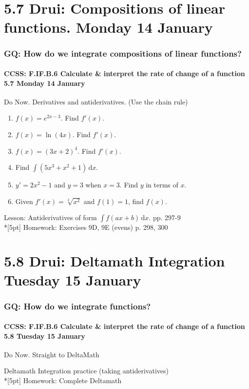 \documentclass{beamer}
\begin{document}
\section{5.7 Drui: Compositions of linear functions. Monday 14 January}
\frame
{
  \frametitle{GQ: How do we integrate compositions of linear functions?}
  \framesubtitle{CCSS: F.IF.B.6 Calculate \& interpret the rate of change of a function  \alert{5.7 Monday 14 January}}

  \begin{block}{Do Now. Derivatives and antiderivatives. (Use the chain rule)}
  \begin{enumerate}
    \item $f(x)=e^{2x-3}$. Find $f'(x)$.
    \item $f(x)= \ln (4x)$. Find $f'(x)$.
    \item $f(x)= (3x+2)^4$. Find $f'(x)$.

    \item Find $\int (5x^3+x^2+1) \,\mathrm{d}x$.
    \item $y'=2x^2-1$ and $y=3$ when $x=3$. Find $y$ in terms of $x$.
    \item Given $f'(x)=\sqrt[3]{x^2}$ and $f(1)=1$, find $f(x)$.
  \end{enumerate}
  \end{block}
  Lesson: Antiderivatives of form $\int f(ax+b) \,\mathrm{d}x$. pp. 297-9\\*[5pt]
  Homework: Exercises 9D, 9E (evens) p. 298, 300
}

\section{5.8 Drui: Deltamath Integration Tuesday 15 January}
\frame
{
  \frametitle{GQ: How do we integrate functions?}
  \framesubtitle{CCSS: F.IF.B.6 Calculate \& interpret the rate of change of a function  \alert{5.8  Tuesday 15 January}}

  \begin{block}{Do Now. Straight to DeltaMath}

  \end{block}
  Deltamath Integration practice (taking antiderivatives)\\*[5pt]
  Homework: Complete Deltamath
}
\end{document}
